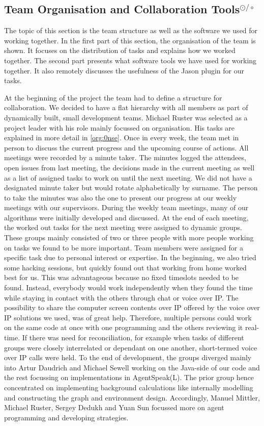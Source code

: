 \subsection[Basic Team Organisation and Collaboration Tools]{Team Organisation and Collaboration Tools$^{\odot/\circ}$}
The topic of this section is the team structure as well as the software we used for working together.
In the first part of this section, the organisation of the team is shown.
It focuses on the distribution of tasks and explains how we worked together.
The second part presents what software tools we have used for working together.
It also remotely discusses the usefulness of the Jason plugin for our tasks.

At the beginning of the project the team had to define a structure for collaboration.
We decided to have a flat hierarchy with all members as part of dynamically built, small development teams.
Michael Ruster was selected as a project leader with his role mainly focussed on organisation.
His tasks are explained in more detail in \autoref{org:0nse}.
Once in every week, the team met in person to discuss the current progress and the upcoming course of actions.
All meetings were recorded by a minute taker.
The minutes logged the attendees, open issues from last meeting, the decisions made in the current meeting as well as a list of assigned tasks to work on until the next meeting.
We did not have a designated minute taker but would rotate alphabetically by surname.
The person to take the minutes was also the one to present our progress at our weekly meetings with our supervisors.
During the weekly team meetings, many of our algorithms were initially developed and discussed.
At the end of each meeting, the worked out tasks for the next meeting were assigned to dynamic groups.
These groups mainly consisted of two or three people with more people working on tasks we found to be more important.
Team members were assigned for a specific task due to personal interest or expertise.
In the beginning, we also tried some hacking sessions, but quickly found out that working from home worked best for us.
This was advantageous because no fixed timeslots needed to be found.
Instead, everybody would work independently when they found the time while staying in contact with the others through chat or voice over IP.
The possibility to share the computer screen contents over IP offered by the voice over IP solutions we used, was of great help.
Therefore, multiple persons could work on the same code at once with one programming and the others reviewing it real-time.
If there was need for reconciliation, for example when tasks of different groups were closely interrelated or dependant on one another, short-termed voice over IP calls were held.
To the end of development, the groups diverged mainly into Artur Daudrich and Michael Sewell working on the Java-side of our code and the rest focussing on implementations in AgentSpeak(L).
The prior group hence concentrated on implementing background calculations like internally modelling and constructing the graph and environment design.
Accordingly, Manuel Mittler, Michael Ruster, Sergey Dedukh and Yuan Sun focussed more on agent programming and developing strategies.

